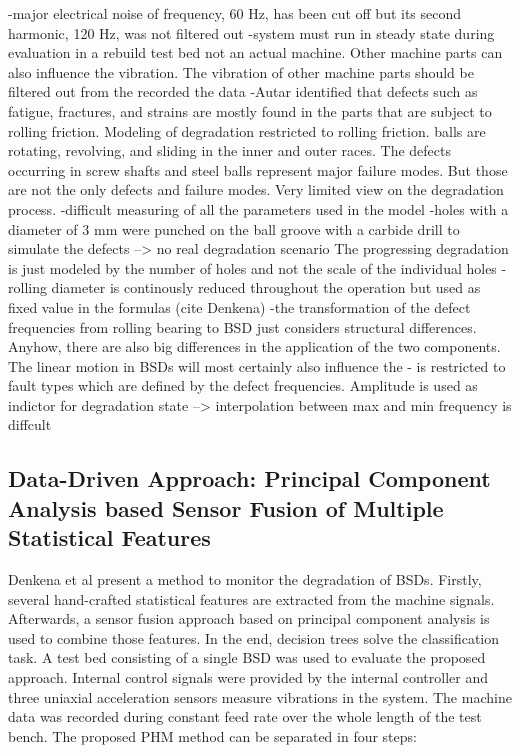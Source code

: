 -major electrical noise of frequency, 60 Hz, has been cut off but its second harmonic, 120 Hz, was not filtered out
-system must run in steady state during evaluation in a rebuild test bed not an actual machine. Other machine parts can also influence the vibration. The vibration of other machine parts should be filtered out from the recorded the data
-Autar identified that defects such as fatigue, fractures, and strains are mostly found in the parts that are subject to rolling friction. Modeling of degradation restricted to rolling friction. balls are rotating, revolving, and sliding in the inner and outer races. The defects occurring in screw shafts and steel balls represent major failure modes. But those are not the only defects and failure modes. Very limited view on the degradation process.
-difficult measuring of all the parameters used in the model
-holes with a diameter of 3 mm were punched on the ball groove with a carbide drill to simulate the defects --> no real degradation scenario
The progressing degradation is just modeled by the number of holes and not the scale of the individual holes
-rolling diameter is continously reduced throughout the operation but used as fixed value in the formulas (cite Denkena)
-the transformation of the defect frequencies from rolling bearing to BSD just considers structural differences. Anyhow, there are also big differences in the application of the two components. The linear motion in BSDs will most certainly also influence the 
- is restricted to fault types which are defined by the defect frequencies. Amplitude is used as indictor for degradation state --> interpolation between max and min frequency is diffcult

\subsection{Data-Driven Approach: Principal Component Analysis based Sensor Fusion of Multiple Statistical Features}

Denkena et al \cite{Denkena2021} present a method to monitor the degradation of BSDs. Firstly, several hand-crafted statistical features are extracted from the machine signals. Afterwards, a sensor fusion approach based on principal component analysis is used to combine those features. In the end, decision trees solve the classification task. A test bed consisting of a single BSD was used to evaluate the proposed approach. Internal control signals were provided by the internal controller and three uniaxial acceleration sensors measure vibrations in the system. The machine data was recorded during constant feed rate over the whole length of the test bench. The proposed PHM method can be separated in four steps:

